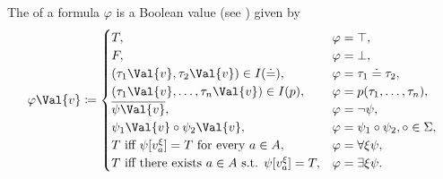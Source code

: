 \begin{definition}
\begin{DefEnum}
     The  of a formula \( \varphi \) is a Boolean value (see ) given by
    \begin{equation}\label{eq:def:first_order_valuation/formula_valuation}
      \varphi\Val{v} \coloneqq \begin{cases}
        T,                                                         &\varphi = \top, \\
        F,                                                         &\varphi = \bot, \\
        (\tau_1\Val{v}, \tau_2\Val{v}) \in I(\doteq),              &\varphi = \tau_1 \doteq \tau_2, \\
        (\tau_1\Val{v}, \ldots, \tau_n\Val{v}) \in I(p),           &\varphi = p(\tau_1, \ldots, \tau_n), \\
        \Ol{\psi\Val{v}},                                          &\varphi = \neg \psi, \\
        \psi_1\Val{v} \circ \psi_2\Val{v},                         &\varphi = \psi_1 \circ \psi_2, \circ \in \Sigma, \\
        T \T{iff} \psi[v_a^\xi] = T \T{for every} a \in A,         &\varphi = \forall \xi \psi, \\
        T \T{iff there exists} a \in A \T{s.t.} \psi[v_a^\xi] = T, &\varphi = \exists \xi \psi.
      \end{cases}
    \end{equation}
  \end{DefEnum}
\end{definition}

